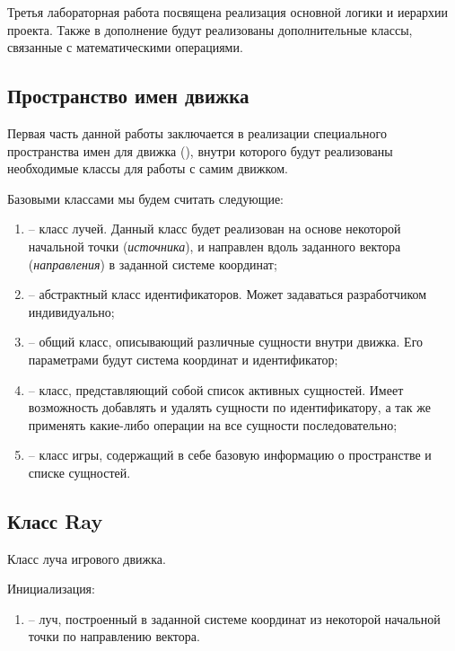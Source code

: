 Третья лабораторная работа посвящена реализация основной логики и иерархии проекта. Также в дополнение будут реализованы дополнительные классы, связанные с математическими операциями. 

\subsection{Пространство имен движка}

	Первая часть данной работы заключается в реализации специального пространства имен для движка (), внутри которого будут реализованы необходимые классы для работы с самим движком. 

	Базовыми классами мы будем считать следующие:
	\begin{enumerate} 
		\item {} -- класс лучей. Данный класс будет реализован на основе некоторой начальной точки (\textit{источника}), и направлен вдоль заданного вектора (\textit{направления}) в заданной системе координат;
		\item {} -- абстрактный класс идентификаторов. Может задаваться разработчиком индивидуально;
		\item {} -- общий класс, описывающий различные сущности внутри движка. Его параметрами будут система координат и идентификатор;
		\item {} -- класс, представляющий собой список активных сущностей. Имеет возможность добавлять и удалять сущности по идентификатору, а так же применять какие-либо операции на все сущности последовательно;
		\item {} -- класс игры, содержащий в себе базовую информацию о пространстве и списке сущностей.
	\end{enumerate} 

\subsection{Класс Ray}
	\noindent Класс луча игрового движка.

	\noindent Инициализация:
	\begin{enumerate}
		\item {} -- луч, построенный в заданной системе координат из некоторой начальной точки по направлению вектора.
	\end{enumerate}

